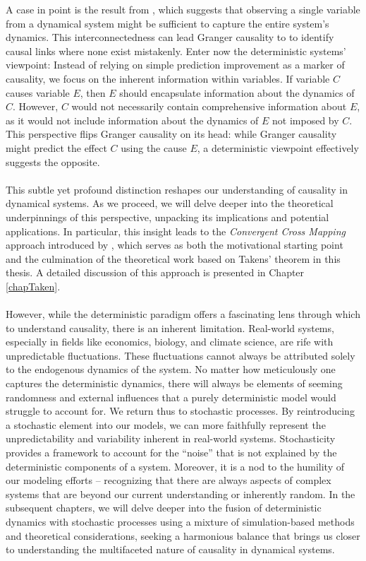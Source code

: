\documentclass[11pt, a4paper]{memoir}
\theoremstyle{break}
\theoremstyle{break}
\theoremstyle{nonumberplain}
\begin{document}
A case in point is the result from \cite{Takens}, which suggests that observing a single variable from a dynamical system might be sufficient to capture the entire system's dynamics. This interconnectedness can lead Granger causality to to identify causal links where none exist mistakenly. Enter now the deterministic systems' viewpoint: Instead of relying on simple prediction improvement as a marker of causality, we focus on the inherent information within variables. If variable 
$C$ causes variable $E$, then $E$ should encapsulate information about the dynamics of $C$. However, $C$ would not necessarily contain comprehensive information about $E$, as it would not include information about the dynamics of $E$ not imposed by $C$. This perspective flips Granger causality on its head: while Granger causality might predict the effect 
$C$ using the cause $E$, a deterministic viewpoint effectively suggests the opposite. \\\\
This subtle yet profound distinction reshapes our understanding of causality in dynamical systems. As we proceed, we will delve deeper into the theoretical underpinnings of this perspective, unpacking its implications and potential applications. In particular, this insight leads to the \emph{Convergent Cross Mapping} approach introduced by \cite{Sugihara}, which serves as both the motivational starting point and the culmination of the theoretical work based on Takens' theorem in this thesis. A detailed discussion of this approach is presented in Chapter \ref{chapTaken}.\\\\
However, while the deterministic paradigm offers a fascinating lens through which to understand causality, there is an inherent limitation. Real-world systems, especially in fields like economics, biology, and climate science, are rife with unpredictable fluctuations. These fluctuations cannot always be attributed solely to the endogenous dynamics of the system. No matter how meticulously one captures the deterministic dynamics, there will always be elements of seeming randomness and external influences that a purely deterministic model would struggle to account for. We return thus to stochastic processes. By reintroducing a stochastic element into our models, we can more faithfully represent the unpredictability and variability inherent in real-world systems. Stochasticity provides a framework to account for the  \enquote{noise} that is not explained by the deterministic components of a system. Moreover, it is a nod to the humility of our modeling efforts – recognizing that there are always aspects of complex systems that are beyond our current understanding or inherently random. 
In the subsequent chapters, we will delve deeper into the fusion of deterministic dynamics with stochastic processes using a mixture of simulation-based methods and theoretical considerations, seeking a harmonious balance that brings us closer to understanding the multifaceted nature of causality in dynamical systems.
\newpage
\end{document}
